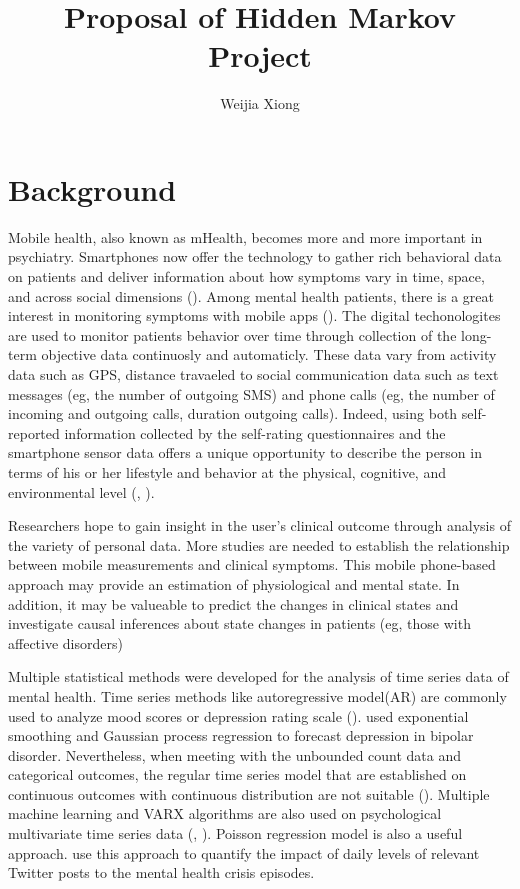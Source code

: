 \documentclass[12pt]{article}
\numberwithin{equation}{section}
\begin{document}
	\title{Proposal of Hidden Markov Project}
	
	\author[$\star$]{Weijia Xiong}


\section{Background}

Mobile health, also known as mHealth, becomes more and more important in psychiatry. Smartphones now offer the technology to gather rich behavioral data on patients and deliver information about how symptoms vary in time, space, and across social dimensions (\citet{torous2015realizing}). Among mental health patients, there is a great interest in monitoring symptoms with mobile apps (\citet{vangeepuram2018smartphone}). The digital techonologites are used to monitor patients behavior over time through collection of the long-term objective data continuosly and automaticly. These data vary from activity data such as GPS, distance travaeled to social communication data such as text messages (eg, the number of outgoing SMS) and phone calls (eg, the number of incoming and outgoing calls, duration outgoing calls). 
Indeed, using both self-reported information collected by the self-rating questionnaires and the smartphone sensor data offers a unique opportunity to describe the person in terms of his or her lifestyle and behavior at the physical, cognitive, and environmental level (\citet{cornet2018systematic}, \citet{torous2018characterizing}).

Researchers hope to gain insight in the user’s clinical outcome through analysis of the variety of personal data. More studies are needed to establish the relationship between mobile  measurements and clinical symptoms. This mobile phone-based approach may provide an estimation of physiological and mental state. In addition, it may be valueable to predict the changes in clinical states and investigate causal inferences about state changes in patients (eg, those with affective disorders) \citet{dogan2017smartphone}

Multiple statistical methods were developed for the analysis of time series data of mental health. Time series methods like autoregressive model(AR) are commonly used to analyze mood scores or depression rating scale (\citet{holmes2016applications}). \citet{moore2012forecasting}used exponential smoothing and Gaussian process regression to forecast depression in bipolar disorder. Nevertheless, when meeting with the unbounded count data and categorical outcomes, the regular time series model that are established on continuous outcomes with continuous distribution are not suitable (\citet{zucchini2017hidden}). Multiple machine learning and VARX algorithms are also used on psychological multivariate time series data (\citet{tuarob2017you}, \citet{reece2017forecasting}). Poisson regression model is also a useful approach. \citet{kolliakou2020mental} use this approach to quantify the impact of daily levels of relevant Twitter posts to the mental health crisis episodes.
\end{document}
